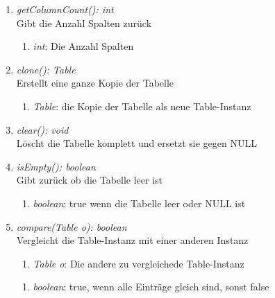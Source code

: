 \begin{enumerate}[+]
	\item \textit{getColumnCount(): int} \\
	Gibt die Anzahl Spalten zurück
	\vspace{-0.2cm}
	\begin{enumerate}[$\circ$]
		\item \textit{int}: Die Anzahl Spalten
	\end{enumerate}

	\item \textit{clone(): Table} \\
	Erstellt eine ganze Kopie der Tabelle
	\vspace{-0.2cm}
	\begin{enumerate}[$\circ$]
		\item \textit{Table}: die Kopie der Tabelle als neue Table-Instanz
	\end{enumerate}

	\item \textit{clear(): void} \\
	Löscht die Tabelle komplett und ersetzt sie gegen NULL

	\item \textit{isEmpty(): boolean} \\
	Gibt zurück ob die Tabelle leer ist
	\vspace{-0.2cm}
	\begin{enumerate}[$\circ$]
		\item \textit{boolean}: true wenn die Tabelle leer oder NULL ist
	\end{enumerate}

	\item \textit{compare(Table o): boolean} \\
	Vergleicht die Table-Instanz mit einer anderen Instanz
	\begin{enumerate}[$\bullet$]
		\item \textit{Table o}: Die andere zu vergleichede Table-Instanz
	\end{enumerate}
	\vspace{-0.2cm}
	\begin{enumerate}[$\circ$]
		\item \textit{boolean}: true, wenn alle Einträge gleich sind, sonst false
	\end{enumerate}
\end{enumerate}